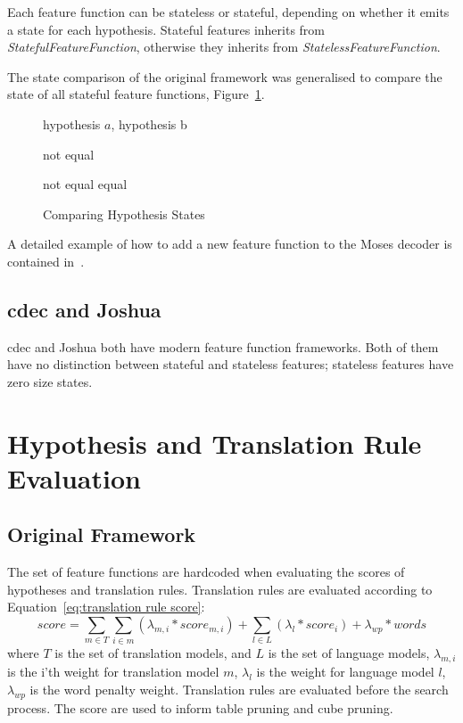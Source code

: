 \documentclass{pbml}
\begin{document}
Each feature function can be stateless or stateful, depending on whether it emits a state for each hypothesis. Stateful features inherits from \emph{StatefulFeatureFunction}, otherwise they inherits from \emph{StatelessFeatureFunction}.

The state comparison of the original framework was generalised to compare the state of all stateful feature functions, Figure~\ref{algo:CompareHypoStates.new}.

\begin{figure} [h!]
\small 
\begin{algorithmic}
\REQUIRE hypothesis $a$, hypothesis b

	\RETURN not equal
       \ENDIF
       
	    \RETURN not equal
	 \ENDIF
        \ENDFOR
        \RETURN equal

\end{algorithmic}
\caption{Comparing Hypothesis States}
\label{algo:CompareHypoStates.new}
\end{figure} 
        
A detailed example of how to add a new feature function to the Moses decoder is contained in\emph{~}.

\subsection{cdec and Joshua}
cdec and Joshua both have modern feature function frameworks. Both of them have no distinction between stateful and stateless features; stateless features have zero size states.

\section{Hypothesis and Translation Rule Evaluation}
\subsection{Original Framework}
The set of feature functions are hardcoded when evaluating the scores of hypotheses and translation rules. Translation rules are evaluated according to Equation~\ref{eq:translation rule score}:
\begin{equation}
  score = \sum_{m \in T} \sum_{i \in m} (\lambda_{m,i} * score_{m,i}) + \sum_{l  \in L} (\lambda_l * score_i) + \lambda_{wp} * words
\label{eq:translation rule score}
\end{equation}
where $T$ is the set of translation models, and $L$ is the set of language models, $\lambda_{m,i}$ is the i'th weight for translation model $m$, $\lambda_l$ is the weight for language model $l$, $\lambda_{wp}$ is the word penalty weight. Translation rules are evaluated before the search process. The score are used to inform table pruning and cube pruning.
\end{document}
